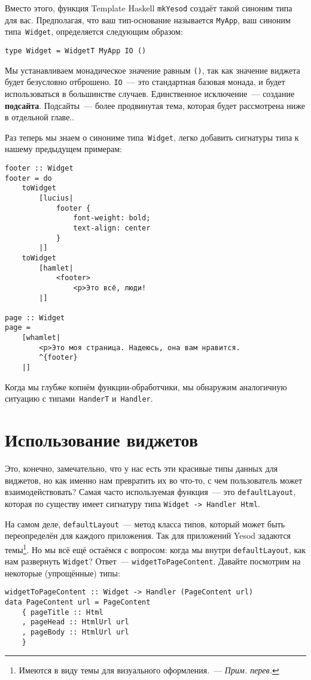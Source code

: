 Вместо этого, функция Template Haskell \lstinline'mkYesod' создаёт такой
синоним типа для вас. Предполагая, что ваш тип-основание называется
\lstinline'MyApp', ваш синоним типа~\lstinline'Widget', определяется следующим
образом:
\begin{lstlisting}
type Widget = WidgetT MyApp IO ()
\end{lstlisting}

Мы устанавливаем монадическое значение равным \lstinline'()', так как значение
виджета будет безусловно отброшено. \lstinline'IO'~--- это стандартная базовая
монада, и будет использоваться в большинстве случаев. Единственное
исключение~--- создание \textbf{подсайта}. Подсайты~--- более продвинутая тема,
которая будет рассмотрена ниже в отдельной главе..

Раз теперь мы знаем о синониме типа~\lstinline'Widget', легко добавить
сигнатуры типа к нашему предыдущем примерам:
\begin{lstlisting}
footer :: Widget
footer = do
    toWidget
        [lucius|
            footer {
                font-weight: bold;
                text-align: center
            }
        |]
    toWidget
        [hamlet|
            <footer>
                <p>Это всё, люди!
        |]

page :: Widget
page =
    [whamlet|
        <p>Это моя страница. Надеюсь, она вам нравится.
        ^{footer}
    |]
\end{lstlisting}

Когда мы глубже копнём функции-обработчики, мы обнаружим аналогичную
ситуацию с типами~\lstinline'HanderT' и~\lstinline'Handler'.

\section{Использование виджетов}
Это, конечно, замечательно, что у нас есть эти красивые типы данных для виджетов,
но как именно нам превратить их во что-то, с чем пользователь может
взаимодействовать? Самая часто используемая функция~--- это
\lstinline'defaultLayout', которая по существу имеет сигнатуру типа
\lstinline'Widget -> Handler Html'.

На самом деле, \lstinline'defaultLayout'~--- метод класса типов, который может
быть переопределён для каждого приложения. Так для приложений Yesod задаются
темы\footnote{Имеются в виду темы для визуального оформления.~--- \emph{Прим.
перев.}}. Но мы всё ещё остаёмся с вопросом: когда мы внутри
\lstinline'defaultLayout', как нам развернуть \lstinline'Widget'? Ответ~---
\lstinline'widgetToPageContent'. Давайте посмотрим на некоторые (упрощённые)
типы:
\begin{lstlisting}
widgetToPageContent :: Widget -> Handler (PageContent url)
data PageContent url = PageContent
    { pageTitle :: Html
    , pageHead :: HtmlUrl url
    , pageBody :: HtmlUrl url
    }
\end{lstlisting}

